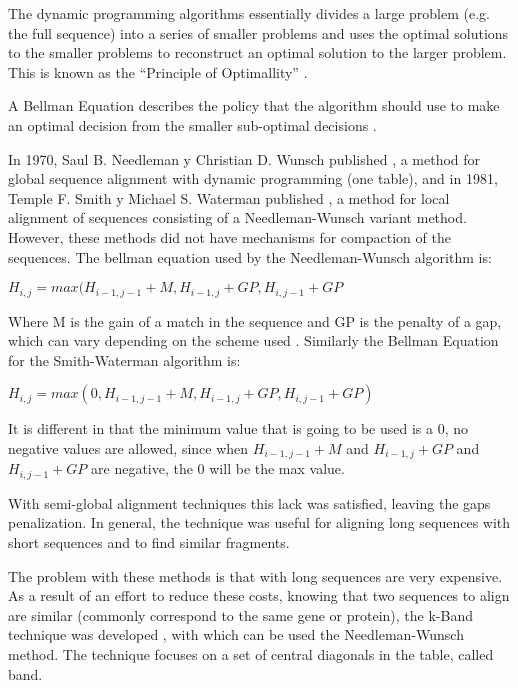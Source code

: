 \documentclass[journal]{IEEEtran}
\begin{document}
The dynamic programming algorithms essentially divides a large problem (e.g. the full sequence) into a series of smaller problems and uses the optimal solutions to the smaller problems to reconstruct an optimal solution to the larger problem. This is known as the ``Principle of Optimallity'' \cite{rbellman1957}.

A Bellman Equation describes the policy that the algorithm should use to make an optimal decision from the smaller sub-optimal decisions \cite{rbellman1957}.

In 1970, Saul B. Needleman y Christian D. Wunsch published \cite{needleman1970align}, a method for global sequence alignment with dynamic programming (one table), and in 1981, Temple F. Smith y Michael S. Waterman published \cite{smith1981align}, a method for local alignment of sequences consisting of a Needleman-Wunsch variant method. However, these methods did not have mechanisms for compaction of the sequences. The bellman equation used by the Needleman-Wunsch algorithm is:

\begin{center}
    $H_{i,j} = max(H_{i-1,j-1} + M, H_{i-1,j} + GP, H_{i,j-1} + GP $ \cite{needleman1970align}
\end{center}

Where M is the gain of a match in the sequence and GP is the penalty of a gap, which can vary depending on the scheme used \cite{needleman1970align}. Similarly the Bellman Equation for the Smith-Waterman algorithm is:

\begin{center}
    $H_{i,j} = max(0, H_{i-1,j-1} + M, H_{i-1,j} + GP, H_{i,j-1} + GP) $ \cite{smith1981align}
\end{center}

It is different in that the minimum value that is going to be used is a 0, no negative values are allowed, since when $H_{i-1,j-1} + M$ and $H_{i-1,j} + GP$ and $H_{i,j-1} + GP$ are negative, the 0 will be the max value.

With semi-global alignment techniques this lack was satisfied, leaving the gaps penalization. In general, the technique was useful for aligning long sequences with short sequences and to find similar fragments.

The problem with these methods is that with long sequences are very expensive. As a result of an effort to reduce these costs, knowing that two sequences to align are similar (commonly correspond to the same gene or protein), the k-Band technique was developed \cite{chao1992align}, with which can be used the Needleman-Wunsch method. The technique focuses on a set of central diagonals in the table, called band.
\end{document}
